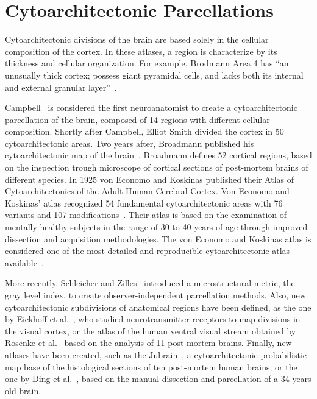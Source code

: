 \section{Cytoarchitectonic Parcellations}
\label{sec:cytoarchitecture}

Cytoarchitectonic divisions of the brain are based solely in the cellular
composition of the cortex. In these atlases, a region is characterize by its
thickness and cellular organization. For example, Brodmann Area 4 has
``an unusually thick cortex; possess giant pyramidal cells,
and lacks both its internal and external granular layer''~\cite{Brodmann1909}.

Campbell~\cite{Campbell1905} is considered the first neuroanatomist to create
a cytoarchitectonic parcellation of the brain, composed of 14 regions with
different cellular composition. Shortly after Campbell, Elliot Smith\cite{Smith1907}
divided the cortex in 50 cytoarchitectonic areas. Two years after, Broadmann
published his cytoarchitectonic map of the brain~\cite{Brodmann1909}. Broadmann
defines 52 cortical regions, based
on the inspection trough microscope of cortical sections of post-mortem
brains of different species. In 1925 von Economo and Koskinas published
their Atlas of Cytoarchitectonics of the Adult Human Cerebral Cortex\cite{VonEconomo1925}.
Von Economo and Koskinas' atlas recognized 54 fundamental cytoarchitectonic areas with
76 variants and 107 modifications~\cite{Triarhou2007}. Their atlas is based on the
examination of mentally healthy subjects in the range of 30 to 40 years of age
through improved dissection and acquisition methodologies. The von Economo and 
Koskinas atlas is considered one of the most detailed and reproducible cytoarchitectonic
atlas available~\cite{Peden1947}.

More recently, Schleicher and Zilles~\cite{Schleicher1990} introduced a microstructural
metric, the gray level index, to create observer-independent parcellation methods.
Also, new cytoarchitectonic subdivisions of anatomical regions have been defined,
as the one by Eickhoff et al.~\cite{Eickhoff2008}, who studied neurotransmitter
receptors to map divisions in the visual cortex, or the atlas of the human
ventral visual stream obtained by Rosenke et al.~\cite{Rosenke2018} based on the
analysis of 11 post-mortem brains. Finally, new atlases have been created, such
as the  Jubrain~\cite{Mohlberg2012}, a cytoarchitectonic probabilistic map base of the
histological sections of ten post-mortem human brains; or the one by
Ding et al.~\cite{Ding2016}, based on the manual dissection and parcellation
of a 34 years old brain.

